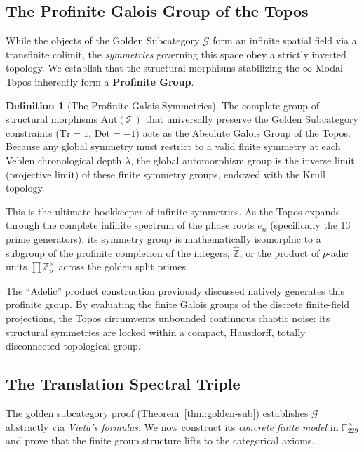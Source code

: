 \documentclass[12pt,oneside]{article}
\theoremstyle{principia}
\theoremstyle{definition}
\newtheorem{definition}[theorem]{Definition}
\theoremstyle{remark}
\providecommand{\FF}{\mathbb{F}}
\providecommand{\GG}{\mathcal{G}}
\providecommand{\TT}{\mathcal{T}}
\providecommand{\lam}{\lambda}
\begin{document}
\subsection{The Profinite Galois Group of the Topos}\label{sec:profinite}

While the objects of the Golden Subcategory $\GG$ form an infinite spatial field via a transfinite colimit, the \emph{symmetries} governing this space obey a strictly inverted topology. We establish that the structural morphisms stabilizing the $\infty$-Modal Topos inherently form a \textbf{Profinite Group}.

\begin{definition}[The Profinite Galois Symmetries]
The complete group of structural morphisms $\mathrm{Aut}(\TT)$ that universally preserve the Golden Subcategory constraints ($\mathrm{Tr} = 1$, $\mathrm{Det} = -1$) acts as the Absolute Galois Group of the Topos. Because any global symmetry must restrict to a valid finite symmetry at each Veblen chronological depth $\lam$, the global automorphism group is the inverse limit (projective limit) of these finite symmetry groups, endowed with the Krull topology.
\end{definition}

This is the ultimate bookkeeper of infinite symmetries. As the Topos expands through the complete infinite spectrum of the phase roots $e_n$ (specifically the 13 prime generators), its symmetry group is mathematically isomorphic to a subgroup of the profinite completion of the integers, $\widehat{\mathbb{Z}}$, or the product of $p$-adic units $\prod \mathbb{Z}_p^\times$ across the golden split primes.

The ``Adelic'' product construction previously discussed natively generates this profinite group. By evaluating the finite Galois groups of the discrete finite-field projections, the Topos circumvents unbounded continuous chaotic noise: its structural symmetries are locked within a compact, Hausdorff, totally disconnected topological group.

\subsection{The Translation Spectral Triple}

The golden subcategory proof (Theorem~\ref{thm:golden-sub}) establishes $\GG$ abstractly via \emph{Vieta's formulas}. We now construct its \emph{concrete finite model} in $\FF_{229}^\times$ and prove that the finite group structure lifts to the categorical axioms.
\end{document}
